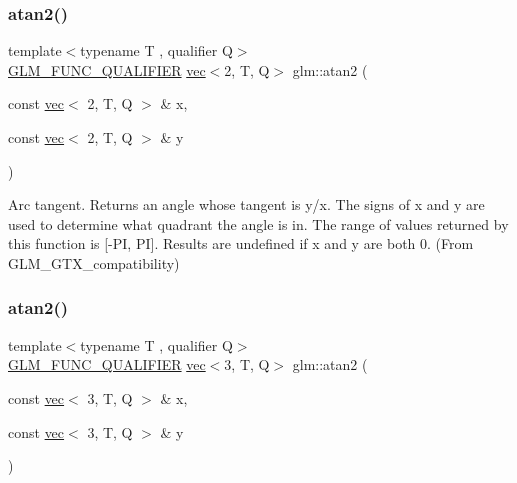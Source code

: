 \subsubsection{\texorpdfstring{atan2()}{atan2()}\hspace{0.1cm}{\footnotesize\ttfamily [2/4]}}
{\footnotesize\ttfamily template$<$typename T , qualifier Q$>$ \\
\mbox{\hyperlink{setup_8hpp_a33fdea6f91c5f834105f7415e2a64407}{G\+L\+M\+\_\+\+F\+U\+N\+C\+\_\+\+Q\+U\+A\+L\+I\+F\+I\+ER}} \mbox{\hyperlink{structglm_1_1vec}{vec}}$<$2, T, Q$>$ glm\+::atan2 (\begin{DoxyParamCaption}\item[{const \mbox{\hyperlink{structglm_1_1vec}{vec}}$<$ 2, T, Q $>$ \&}]{x,  }\item[{const \mbox{\hyperlink{structglm_1_1vec}{vec}}$<$ 2, T, Q $>$ \&}]{y }\end{DoxyParamCaption})}



Arc tangent. Returns an angle whose tangent is y/x. The signs of x and y are used to determine what quadrant the angle is in. The range of values returned by this function is \mbox{[}-\/\+PI, PI\mbox{]}. Results are undefined if x and y are both 0. (From G\+L\+M\+\_\+\+G\+T\+X\+\_\+compatibility) 

\mbox{\label{group__gtx__compatibility_gac39314f5087e7e51e592897cabbc1927}} 
\subsubsection{\texorpdfstring{atan2()}{atan2()}\hspace{0.1cm}{\footnotesize\ttfamily [3/4]}}
{\footnotesize\ttfamily template$<$typename T , qualifier Q$>$ \\
\mbox{\hyperlink{setup_8hpp_a33fdea6f91c5f834105f7415e2a64407}{G\+L\+M\+\_\+\+F\+U\+N\+C\+\_\+\+Q\+U\+A\+L\+I\+F\+I\+ER}} \mbox{\hyperlink{structglm_1_1vec}{vec}}$<$3, T, Q$>$ glm\+::atan2 (\begin{DoxyParamCaption}\item[{const \mbox{\hyperlink{structglm_1_1vec}{vec}}$<$ 3, T, Q $>$ \&}]{x,  }\item[{const \mbox{\hyperlink{structglm_1_1vec}{vec}}$<$ 3, T, Q $>$ \&}]{y }\end{DoxyParamCaption})}



